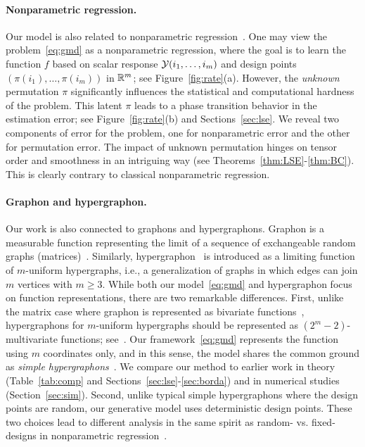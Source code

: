 \documentclass[11pt]{article}
\theoremstyle{definition}
\begin{document}
\paragraph{Nonparametric regression.} Our model is also related to nonparametric regression~\citep{tsybakov2009introduction}. One may view the problem~\eqref{eq:gmd} as a nonparametric regression, where the goal is to learn the function $f$ based on scalar response $\mathcal{Y}(i_1,\ldots,i_m)$ and design points $(\pi({i_1}),\ldots,\pi({i_m}))$ in $\mathbb{R}^m$; see Figure~\ref{fig:rate}(a). However, the \emph{unknown} permutation $\pi$ significantly influences the statistical and computational hardness of the problem. This latent $\pi$ leads to a phase transition behavior in the estimation error; see Figure~\ref{fig:rate}(b) and Sections~\ref{sec:lse}. We reveal  two components of error for the problem, one for nonparametric error and the other for permutation error. The impact of unknown permutation hinges on tensor order and smoothness in an intriguing way (see Theorems~\ref{thm:LSE}-\ref{thm:BC}). This is clearly contrary to classical nonparametric regression. 

\paragraph{Graphon and hypergraphon.} Our work is also connected to graphons and hypergraphons. Graphon is a measurable function representing the limit of a sequence of exchangeable random graphs (matrices)~\citep{klopp2017oracle,gao2015rate,chan2014consistent}. Similarly, hypergraphon~\citep{zhao2015hypergraph,lovasz2012large} is introduced as a limiting function of $m$-uniform hypergraphs, i.e., a generalization of graphs in which edges can join $m$ vertices with $m\geq 3$. While both our model~\eqref{eq:gmd} and hypergraphon focus on function representations, there are two remarkable differences. First, unlike the matrix case where graphon is represented as bivariate functions~\citep{lovasz2012large}, hypergraphons for $m$-uniform hypergraphs should be represented as $(2^m-2)$-multivariate functions; see~\citet[Section 1.2]{zhao2015hypergraph}. Our framework~\eqref{eq:gmd} represents the function using $m$ coordinates only, and in this sense, the model shares the common ground as \emph{simple hypergraphons}~\citep{balasubramanian2021nonparametric}. We compare our method to earlier work in theory (Table~\ref{tab:comp} and Sections~\ref{sec:lse}-\ref{sec:borda}) and in numerical studies (Section~\ref{sec:sim}). Second, unlike typical simple hypergraphons where the design points are random, our generative model uses deterministic design points. These two choices lead to different analysis in the same spirit as random- vs. fixed-designs in nonparametric regression~\citep{wasserman2006all,tsybakov2009introduction}. 
\end{document}
